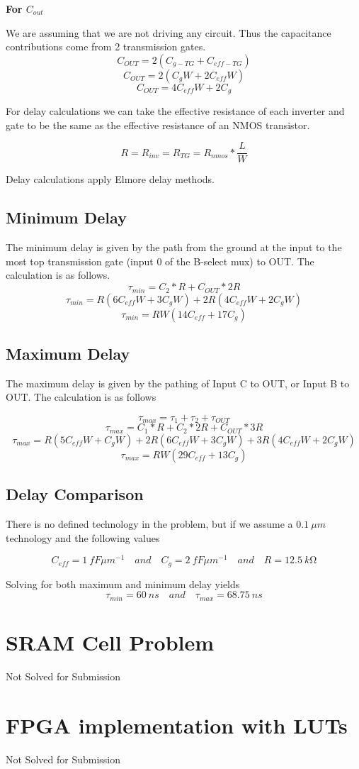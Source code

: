 \documentclass[12pt]{article}
\begin{document}
\textbf{For $C_{out}$}

We are assuming that we are not driving any circuit. Thus the capacitance contributions come from 2 transmission gates.
\[C_{OUT} = 2(C_{g-TG} + C_{eff-TG}) \]
\[C_{OUT} = 2(C_g W + 2C_{eff}W)\]
\[C_{OUT} = 4C_{eff}W + 2C_g \]

For delay calculations we can take the effective resistance of each inverter and gate to be the same as the effective resistance of an NMOS transistor.

\[R = R_{inv} = R_{TG} = R_{nmos} * \frac{L}{W}\]

Delay calculations apply Elmore delay methods.

\subsection{Minimum Delay}
The minimum delay is given by the path from the ground at the input to the most top transmission gate (input 0 of the B-select mux) to OUT. The calculation is as follows.
\[\tau_{min} = C_2*R + C_{OUT}*2R\]
\[\tau_{min} = R(6C_{eff}W + 3C_gW) + 2R(4C_{eff}W + 2C_gW)\]
\[\tau_{min} = RW(14C_{eff} + 17C_g)\]


\subsection{Maximum Delay}
The maximum delay is given by the pathing of Input C to OUT, or Input B to OUT. The calculation is as follows

\[\tau_{max} = \tau_{1} + \tau_{2} + \tau_{OUT}\]
\[\tau_{max} = C_1*R + C_2 * 2R + C_{OUT}*3R\]
\[\tau_{max} = R(5C_{eff}W + C_gW) + 2R(6C_{eff}W + 3C_gW) + 3R(4C_{eff}W + 2C_gW)\]
\[\tau_{max} = RW(29C_{eff} + 13C_g)\]

\subsection{Delay Comparison}
There is no defined technology in the problem, but if we assume a $\SI{0.1}{\mu m}$ technology and the following values 

\[C_{eff} = \SI{1}{fF \mu m^{-1}} \quad and \quad C_g = \SI{2}{fF \mu m^{-1}} \quad and \quad R = \SI{12.5}{k\ohm}\]

Solving for both maximum and minimum delay yields
\[\tau_{min} = \SI{60}{ns} \quad and \quad \tau_{max} = \SI{68.75}{ns} \]

\section{SRAM Cell Problem}                                 %
Not Solved for Submission
\section{FPGA implementation with LUTs}                     %
Not Solved for Submission
\end{document}

